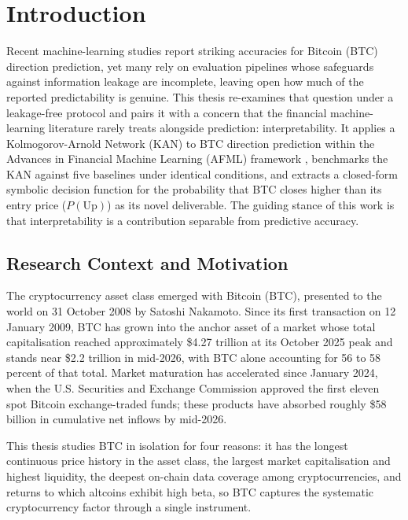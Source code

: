 \section{Introduction}\label{sec:introduction}

Recent machine-learning studies report striking accuracies for Bitcoin (BTC) direction prediction, yet many rely on evaluation pipelines whose safeguards against information leakage are incomplete, leaving open how much of the reported predictability is genuine. This thesis re-examines that question under a leakage-free protocol and pairs it with a concern that the financial machine-learning literature rarely treats alongside prediction: interpretability. It applies a Kolmogorov-Arnold Network (KAN) to BTC direction prediction within the Advances in Financial Machine Learning (AFML) framework \citep{lopez_de_prado_2018}, benchmarks the KAN against five baselines under identical conditions, and extracts a closed-form symbolic decision function for the probability that BTC closes higher than its entry price ($P(\text{Up})$) as its novel deliverable. The guiding stance of this work is that interpretability is a contribution separable from predictive accuracy.


\subsection{Research Context and Motivation}\label{subsec:context}


The cryptocurrency asset class emerged with Bitcoin (BTC), presented to the world on 31 October 2008 by Satoshi Nakamoto. Since its first transaction on 12 January 2009, BTC has grown into the anchor asset of a market whose total capitalisation reached approximately \$4.27 trillion at its October 2025 peak and stands near \$2.2 trillion in mid-2026, with BTC alone accounting for 56 to 58 percent of that total. Market maturation has accelerated since January 2024, when the U.S. Securities and Exchange Commission approved the first eleven spot Bitcoin exchange-traded funds; these products have absorbed roughly \$58 billion in cumulative net inflows by mid-2026.

This thesis studies BTC in isolation for four reasons: it has the longest continuous price history in the asset class, the largest market capitalisation and highest liquidity, the deepest on-chain data coverage among cryptocurrencies, and returns to which altcoins exhibit high beta, so BTC captures the systematic cryptocurrency factor through a single instrument.

